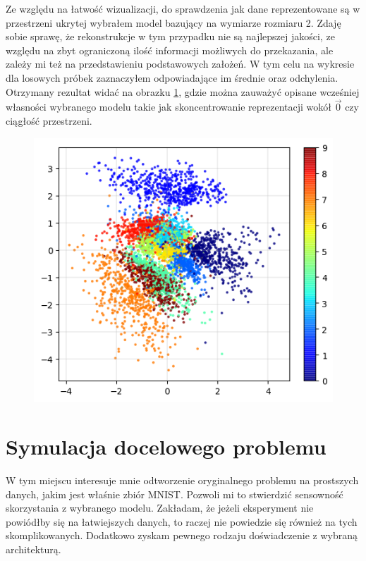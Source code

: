 Ze względu na łatwość wizualizacji, do sprawdzenia jak dane reprezentowane są w przestrzeni ukrytej wybrałem model bazujący na wymiarze rozmiaru 2. Zdaję sobie sprawę, że rekonstrukcje w tym przypadku nie są najlepszej jakości, ze względu na zbyt ograniczoną ilość informacji możliwych do przekazania, ale zależy mi też na przedstawieniu podstawowych założeń. W tym celu na wykresie dla losowych próbek zaznaczyłem odpowiadające im średnie oraz odchylenia. Otrzymany rezultat widać na obrazku \ref{fig:mnist_2d}, gdzie można zauważyć opisane wcześniej własności wybranego modelu takie jak skoncentrowanie reprezentacji wokół $\vec{0}$ czy ciągłość przestrzeni.

\begin{figure}[h!]
    \centering
    \includegraphics[width=1.\textwidth]{images/mnist_2d}
    \caption{}
    \label{fig:mnist_2d}
\end{figure}

\section{Symulacja docelowego problemu}

W tym miejscu interesuje mnie odtworzenie oryginalnego problemu na prostszych danych, jakim jest właśnie zbiór MNIST. Pozwoli mi to stwierdzić sensowność skorzystania z wybranego modelu. Zakładam, że jeżeli eksperyment nie powiódłby się na łatwiejszych danych, to raczej nie powiedzie się również na tych skomplikowanych. Dodatkowo zyskam pewnego rodzaju doświadczenie z wybraną architekturą.

